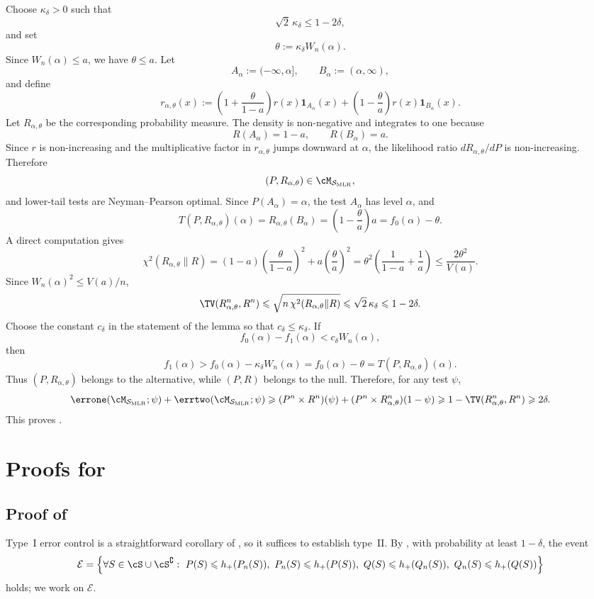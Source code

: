 \documentclass[english]{article}
\theoremstyle{plain}
\theoremstyle{definition}
\newcommand{\Toff}[2]{T(#1,#2)}
\newcommand{\errsum}[1]{\errone(\cM_{\smlr};#1)+\errtwo(\cM_{\smlr};#1)}
\newcommand{\fnull}{f_0}
\newcommand{\falt}{f_1}
\newcommand{\smlr}{\mathcal{S}_{\mathrm{MLR}}}     %
\newcommand{\hup}{h_+}                             %
\begin{document}
Choose \(\kappa_\delta>0\) such that
\[
\sqrt2\,\kappa_\delta\leqslant 1-2\delta,
\]
and set
\[
\theta:=\kappa_\delta W_n(\alpha).
\]
Since \(W_n(\alpha)\leqslant a\), we have \(\theta\leqslant a\).  Let
\[
A_\alpha:=(-\infty,\alpha],
\qquad
B_\alpha:=(\alpha,\infty),
\]
and define
\[
r_{\alpha,\theta}(x)
:=
\left(1+\frac{\theta}{1-a}\right)r(x)\mathbf 1_{A_\alpha}(x)
+
\left(1-\frac{\theta}{a}\right)r(x)\mathbf 1_{B_\alpha}(x).
\]
Let \(R_{\alpha,\theta}\) be the corresponding probability measure.  The
density is non-negative and integrates to one because
\[
R(A_\alpha)=1-a,
\qquad
R(B_\alpha)=a.
\]
Since \(r\) is non-increasing and the multiplicative factor in
\(r_{\alpha,\theta}\) jumps downward at \(\alpha\), the likelihood ratio
\(dR_{\alpha,\theta}/dP\) is non-increasing.  Therefore
\[
(P,R_{\alpha,\theta})\in\cM_{\smlr},
\]
and lower-tail tests are Neyman--Pearson optimal.  Since
\(P(A_\alpha)=\alpha\), the test \(A_\alpha\) has level \(\alpha\), and
\[
\Toff{P}{R_{\alpha,\theta}}(\alpha)
=
R_{\alpha,\theta}(B_\alpha)
=
\left(1-\frac{\theta}{a}\right)a
=
\fnull(\alpha)-\theta.
\]
A direct computation gives
\[
\chi^2(R_{\alpha,\theta}\|R)
=
(1-a)\left(\frac{\theta}{1-a}\right)^2
+
a\left(\frac{\theta}{a}\right)^2
=
\theta^2\left(\frac1{1-a}+\frac1a\right)
\leqslant
\frac{2\theta^2}{V(a)}.
\]
Since \(W_n(\alpha)^2\leqslant V(a)/n\),
\[
\TV(R_{\alpha,\theta}^n,R^n)
\leqslant
\sqrt{n\,\chi^2(R_{\alpha,\theta}\|R)}
\leqslant
\sqrt2\,\kappa_\delta
\leqslant
1-2\delta.
\]
Choose the constant \(c_\delta\) in the statement of the lemma so that
\(c_\delta\leqslant\kappa_\delta\).  If
\[
\fnull(\alpha)-\falt(\alpha)<c_\delta W_n(\alpha),
\]
then
\[
\falt(\alpha)
>
\fnull(\alpha)-\kappa_\delta W_n(\alpha)
=
\fnull(\alpha)-\theta
=
\Toff{P}{R_{\alpha,\theta}}(\alpha).
\]
Thus \((P,R_{\alpha,\theta})\) belongs to the alternative, while
\((P,R)\) belongs to the null.  Therefore, for any test \(\psi\),
\[
\errsum{\psi}
\geqslant
(P^n\times R^n)(\psi)
+
(P^n\times R_{\alpha,\theta}^n)(1-\psi)
\geqslant
1-\TV(R_{\alpha,\theta}^n,R^n)
\geqslant
2\delta.
\]
This proves .



\section{Proofs for }\label{app:misspecification}
\subsection{Proof of }\label{sec:proof-misspecified}
Type~I error control is a straightforward corollary of , so it suffices to establish type~II. By , with probability at least $1-\delta$, the event
\[
\mathcal E=\Bigl\{\forall S\in\cS\cup\cS^\complement:\ P(S)\leqslant\hup(P_n(S)),\ P_n(S)\leqslant\hup(P(S)),\ Q(S)\leqslant\hup(Q_n(S)),\ Q_n(S)\leqslant\hup(Q(S))\Bigr\}
\]
holds; we work on $\mathcal E$. 
\end{document}
